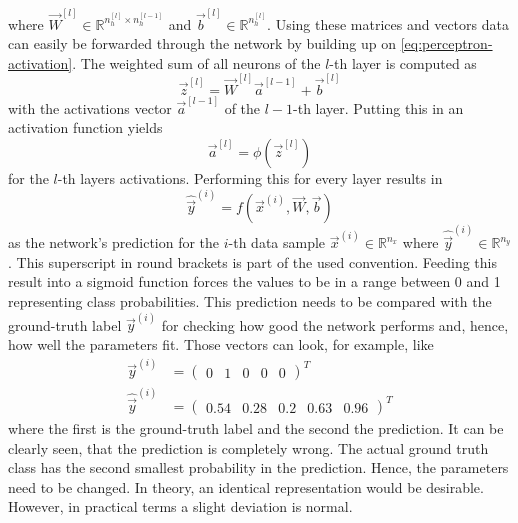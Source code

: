 where $\vec{W}^{[l]} \in \mathbb{R}^{n^{[l]}_h \times n^{[l-1]}_h}$ and $\vec{b}^{[l]} \in \mathbb{R}^{n^{[l]}_h}$.
Using these matrices and vectors data can easily be forwarded through the network by building up on \eqref{eq:perceptron-activation}.
The weighted sum of all neurons of the $l$-th layer is computed as
\begin{equation}
	\label{eq:weighted-sum}
	\vec{z}^{[l]} = \vec{W}^{[l]} \vec{a}^{[l-1]} + \vec{b}^{[l]}
\end{equation}
with the activations vector $\vec{a}^{[l-1]}$ of the $l-1$-th layer.
Putting this in an activation function yields
\begin{equation}
	\label{eq:activations}
	\vec{a}^{[l]} = \phi\left(\vec{z}^{[l]}\right)
\end{equation}
for the $l$-th layers activations.
Performing this for every layer results in 
\begin{equation}
	\label{eq:feedforward}
	\hat{\vec{y}}^{(i)} = f(\vec{x}^{(i)}, \vec{W}, \vec{b})
\end{equation}
as the network's prediction for the $i$-th data sample $\vec{x}^{(i)} \in \mathbb{R}^{n_x}$ where $\hat{\vec{y}}^{(i)} \in \mathbb{R}^{n_y}$.
This superscript in round brackets is part of the used convention.
Feeding this result into a sigmoid function forces the values to be in a range between 0 and 1 representing class probabilities.
This prediction needs to be compared with the ground-truth label $\vec{y}^{(i)}$ for checking how good the network performs and, hence, how well the parameters fit.
Those vectors can look, for example, like
\begin{subequations}
	\begin{align}
		\vec{y}^{(i)} &= \begin{pmatrix} 0 & 1 & 0 & 0 & 0 \end{pmatrix}^T \\
		\hat{\vec{y}}^{(i)} &= \begin{pmatrix} 0.54 & 0.28 & 0.2 & 0.63 & 0.96 \end{pmatrix}^T
	\end{align}
\end{subequations}
where the first is the ground-truth label and the second the prediction.
It can be clearly seen, that the prediction is completely wrong.
The actual ground truth class has the second smallest probability in the prediction.
Hence, the parameters need to be changed.
In theory, an identical representation would be desirable.
However, in practical terms a slight deviation is normal.
